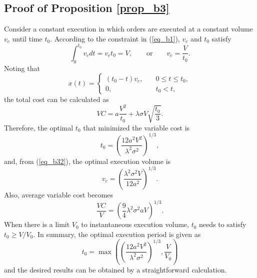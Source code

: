 \subsection{Proof of Proposition \ref{prop_b3}}
 Consider a constant execution in which orders are executed at a constant volume $v_c$ until time $t_0$.
 According to the constraint in (\ref{eq_b1}), $v_c$ and $t_0$ satisfy
\begin{equation}\label{eq_b32}
  \int_0^{t_0} v_c dt = v_c t_0 = V, \qquad \mbox{or} \qquad v_c = \frac{V}{t_0}.
\end{equation}
 Noting that
\[
  x(t) = \left\{
  \begin{array}{ll}
   (t_0-t)v_c, & \quad 0\leq t\leq t_0, \\
   0, & \quad t_0 < t,
  \end{array}
  \right.
\]
the total cost can be calculated as
\[
  VC = a \frac{V^2}{t_0} + \lambda \sigma V \sqrt{\frac{t_0}{3}}.
\]
 Therefore, the optimal $t_0$ that minimized the variable cost is
\[
  t_0 = \left( \frac{12a^2V^2}{\lambda^2\sigma^2} \right)^{1/3},
\]
and, from (\ref{eq_b32}), the optimal execution volume is
\[
  v_c = \left( \frac{\lambda^2 \sigma^2 V}{12a^2} \right)^{1/3}.
\]
 Also, average variable cost becomes
\[
  \frac{VC}{V} = \left( \frac{9}{4} \lambda^2 \sigma^2 aV \right)^{1/3}.
\]
 When there is a limit $V_0$ to instantaneous execution volume, $t_0$ needs to satisfy
$t_0 \geq V/V_0$.
 In summary, the optimal execution period is given as
\[
  t_0 = \max \left( \left( \frac{12a^2V^2}{\lambda^2\sigma^2} \right)^{1/3}, \frac{V}{V_0} \right)
\]
and the desired results can be obtained by a straightforward calculation.
